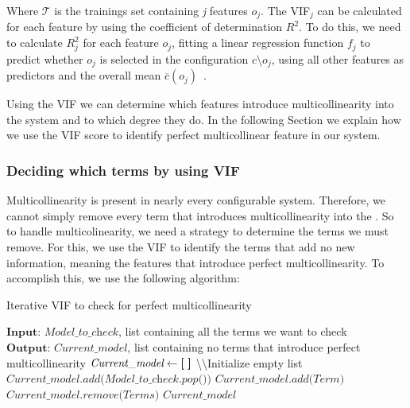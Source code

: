 Where $\mathcal{T}$ is the trainings set containing \textit{j} features $o_j$. The VIF$_{j}$ can be calculated for each feature by using the coefficient
of determination $R^2$. To do this, we need to calculate $R^{2}_j$ for each feature $o_j$, fitting a linear regression function $f_j$ to predict whether $o_j$
is selected in the configuration $c \setminus o_j$, using all other features as predictors and the overall mean $\overline{c}(o_j)$~\cite{Multicollinearity}.

Using the VIF we can determine which features introduce multicollinearity into the system and to which degree they do. In the following Section we 
explain how we use the VIF score to identify perfect multicollinear feature in our system.

\subsubsection{Deciding which terms by using VIF}
Multicollinearity is present in nearly every configurable system. 
Therefore, we cannot simply remove every term that introduces multicollinearity into the {\perfInfluenceModel}. 
So to handle multicolinearity, we need a strategy to determine the terms we must remove. 
For this, we use the VIF to identify the terms that add no new information, 
meaning the features that introduce perfect multicollinearity. To accomplish this, we use the following algorithm:

\begin{algorithm}
    \caption{Iterative VIF to check for perfect multicollinearity}\label{alg:vif_iterative}
    \begin{algorithmic}[1]
    \State $\textbf{Input: } \textit{Model\_to\_check}$, list containing all the terms we want to check 
    \State $\textbf{Output: } \textit{Current\_model}$, list containing no terms that introduce perfect multicollinearity
    \State $\textit{Current\_model} \gets \textbf{[\;]}$ \textbackslash\textbackslash Initialize empty list
    \State $\textit{Current\_model.add(Model\_to\_check.pop())} $ \label{alg:vif_add_item}
        \State $\textit{Current\_model.add(Term)}$
        \label{alg:vif_check} \\    
            \qquad$\textit{Current\_model.remove(Terms)}$ 
        \EndIf
    \EndFor
    \State\Return $\textit{Current\_model}$

    \end{algorithmic}
\end{algorithm}

